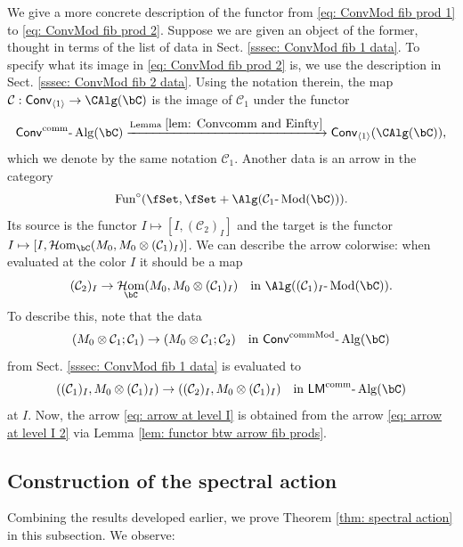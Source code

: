 \documentclass[10pt]{amsart}
\newcommand{\sssec}{\subsubsection}
\theoremstyle{remark}
\newcommand{\te}{\text}
\newcommand{\on}{\operatorname}
\newcommand{\cC}{\mathcal{C}}
\newcommand{\lMod}{\text{-}\on{Mod}}
\newcommand{\lAlg}{\text{-}\on{Alg}}
\DeclareMathOperator{\cHom}{\mathcal{H}om}
\newcommand{\Fun}{\on{Fun}}
\newcommand{\Conv}{\mathsf{Conv}}
\newcommand{\Convcomm}{\mathsf{Conv}^{\on{comm}}}
\newcommand{\ConvcMod}{\mathsf{Conv}^{\on{commMod}}}
\newcommand{\LMcomm}{\mathsf{LM}^{\on{comm}}}
\begin{document}
\sssec{}\label{sssec: description image}
We give a more concrete description of the functor from \eqref{eq: ConvMod fib prod 1} to \eqref{eq: ConvMod fib prod 2}. Suppose we are given an object of the former, thought in terms of the list of data in Sect. \ref{sssec: ConvMod fib 1 data}. To specify what its image in \eqref{eq: ConvMod fib prod 2} is, we use the description in Sect. \ref{sssec: ConvMod fib 2 data}. Using the notation therein, the map $\cC:\Conv_{\langle 1\rangle}\rightarrow \CAlg(\bC)$ is the image of $\cC_1$ under the functor
\[\Convcomm\lAlg(\bC)\xrightarrow{\te{Lemma }\ref{lem: Convcomm and Einfty}} \Conv_{\langle 1\rangle}(\CAlg(\bC)),\]
which we denote by the same notation $\cC_1$. Another data is an arrow in the category
\begin{equation}\label{eq: Alg cC_1 Mod}
    \Fun^{\circ}(\fSet,\fSet+\Alg(\cC_1\lMod(\bC))).
\end{equation}
Its source is the functor
$I\mapsto [I, (\cC_2)_I]$
and the target is the functor
$I\mapsto [I, \cHom_{\bC}(M_0, M_0\otimes (\cC_1)_I)]$. We can describe the arrow colorwise: when evaluated at the color $I$ it should be a map
\begin{equation}\label{eq: arrow at level I}
    (\cC_2)_I\rightarrow \cHom_{\bC}(M_0, M_0\otimes (\cC_1)_I)\quad \te{in } \Alg((\cC_1)_I\lMod(\bC)).
\end{equation}
To describe this, note that the data
\[(M_0\otimes\cC_1;\cC_1)\rightarrow (M_0\otimes\cC_1;\cC_2)\quad\te{in }\ConvcMod\lAlg(\bC)\]
from Sect. \ref{sssec: ConvMod fib 1 data} is evaluated to
\begin{equation}\label{eq: arrow at level I 2}
    ((\cC_1)_I, M_0\otimes(\cC_1)_I)\rightarrow ((\cC_2)_I,M_0\otimes (\cC_1)_I) \quad \te{in }\LMcomm\lAlg(\bC)
\end{equation}
at $I$. Now, the arrow \eqref{eq: arrow at level I} is obtained from the arrow \eqref{eq: arrow at level I 2} via Lemma \ref{lem: functor btw arrow fib prods}.


\subsection{Construction of the spectral action}\label{ssec: construction of the spectral action}
Combining the results developed earlier, we prove Theorem \ref{thm: spectral action} in this subsection.
We observe:
\end{document}
